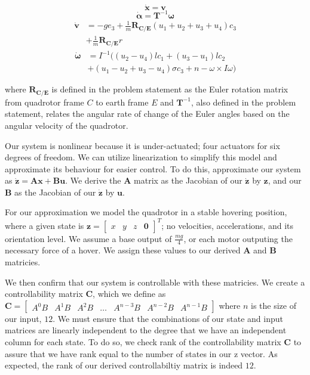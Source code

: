 \documentclass{article}
\begin{document}
\begin{multicols}{2}
\begin{equation}
    \mathbf{\dot{x}} =\mathbf{v}
\end{equation}
\begin{equation}
    \bm{\dot{\alpha}} =\mathbf{T}^{-1}\bm{\omega}
\end{equation}
\begin{align}
    \mathbf{\dot{v}} &=-ge_3+\frac{1}{m}\mathbf{R_{C/E}}(u_1+u_2+u_3+u_4)c_3 \nonumber\\ &+\frac{1}{m}\mathbf{R_{C/E}}r
\end{align}
\begin{align}
    \bm{\dot{\omega}} &=I^{-1}((u_2-u_4)lc_1+(u_3-u_1)lc_2 \nonumber\\ &+(u_1-u_2+u_3-u_4)\sigma c_3+n-\omega \times I \omega)
\end{align}

\noindent where $\mathbf{R_{C/E}}$ is defined in the problem statement as the Euler rotation matrix from quadrotor frame $C$ to earth frame $E$ and $\mathbf{T}^{-1}$, also defined in the problem statement, relates the angular rate of change of the Euler angles based on the angular velocity of the quadrotor.

Our system is nonlinear because it is under-actuated; four actuators for six degrees of freedom. We can utilize linearization to simplify this model and approximate its behaviour for easier control. To do this,  approximate our system as $\boldsymbol{\dot{z}}=\boldsymbol{A}\boldsymbol{x}+\boldsymbol{B}\boldsymbol{u}$. We derive the $\boldsymbol{A}$ matrix as the Jacobian of our $\boldsymbol{\dot{z}}$ by $\boldsymbol{z}$, and our $\boldsymbol{B}$ as the Jacobian of our $\boldsymbol{\dot{z}}$ by $\boldsymbol{u}$. 

For our approximation we model the quadrotor in a stable hovering position, where a given state is $\boldsymbol{z}=\begin{bmatrix} 
x & y & z & \boldsymbol{0}\end{bmatrix}^T$; no velocities, accelerations, and its orientation level. We assume a base output of $
\frac{mg}{4}$, or each motor outputing the necessary force of a hover. We assign these values to our derived $\boldsymbol{A}$ and 
$\boldsymbol{B}$ matricies.

We then confirm that our system is controllable with these matricies. We create a controllability matrix $\boldsymbol{C}$, 
which we define as $\boldsymbol{C} = \begin{bmatrix} A^0B & A^1B & A^2B & \dots & A^{n-3}B & A^{n-2}B & A^{n-1}B\end{bmatrix}$ 
where $n$ is the size of our input, $12$. We must ensure that the combinations of our state and input matrices are linearly 
independent to the degree that we have an independent column for each state. To do so, we check rank of the controllability matrix $
\boldsymbol{C}$ to assure that we have rank equal to the number of states in our z vector. As expected, the rank of our derived 
controllabiltiy matrix is indeed $12$.


\end{multicols}
\end{document}
